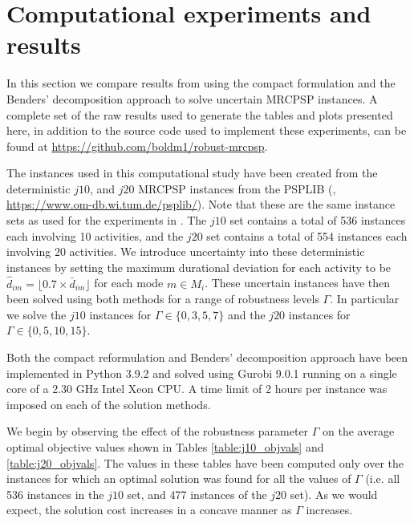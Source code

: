 \documentclass[a4paper,abstracton]{scrartcl}
\begin{document}
\section{Computational experiments and results} \label{section:experiments}
 
In this section we compare results from using the compact formulation and the Benders' decomposition approach to solve uncertain MRCPSP instances. A complete set of the raw results used to generate the tables and plots presented here, in addition to the source code used to implement these experiments, can be found at \url{https://github.com/boldm1/robust-mrcpsp}.

The instances used in this computational study have been created from the deterministic $j10$, and $j20$ MRCPSP instances from the PSPLIB (\cite{kolisch1997psplib}, \url{https://www.om-db.wi.tum.de/psplib/}). Note that these are the same instance sets as used for the experiments in \cite{balouka2021robust}. The $j10$ set contains a total of 536 instances each involving 10 activities, and the $j20$ set contains a total of 554 instances each involving 20 activities. We introduce uncertainty into these deterministic instances by setting the maximum durational deviation for each activity to be $\hat{d}_{im}=\lfloor0.7\times \bar{d}_{im}\rfloor$ for each mode $m\in M_i$. These uncertain instances have then been solved using both methods for a range of robustness levels $\Gamma$. In particular we solve the $j10$ instances for $\Gamma\in\{0,3,5,7\}$ and the $j20$ instances for $\Gamma\in\{0,5,10,15\}$. 

Both the compact reformulation and Benders' decomposition approach have been implemented in Python 3.9.2 and solved using Gurobi 9.0.1 running on a single core of a 2.30 GHz Intel Xeon CPU. A time limit of 2 hours per instance was imposed on each of the solution methods.

We begin by observing the effect of the robustness parameter $\Gamma$ on the average optimal objective values shown in Tables \ref{table:j10_objvals} and \ref{table:j20_objvals}. The values in these tables have been computed only over the instances for which an optimal solution was found for all the values of $\Gamma$ (i.e. all 536 instances in the $j10$ set, and 477 instances of the $j20$ set). As we would expect, the solution cost increases in a concave manner as $\Gamma$ increases. 
\end{document}
